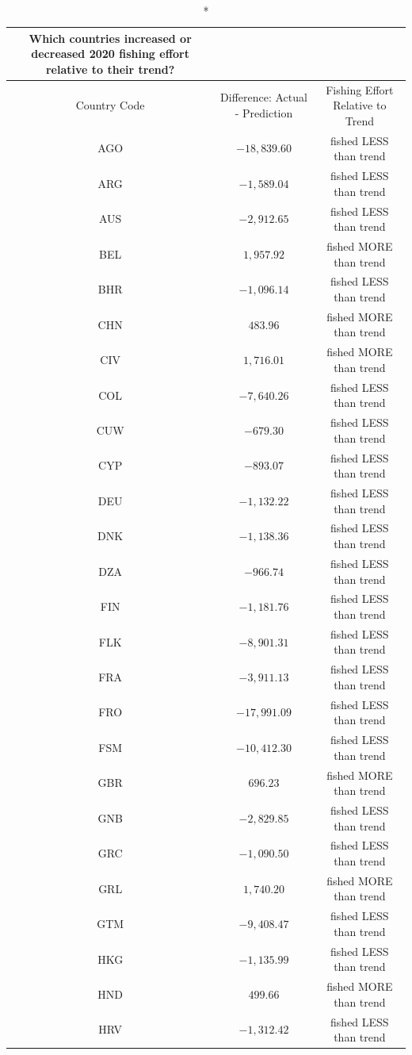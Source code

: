 \documentclass[
]{article}
\begin{document}
\captionsetup[table]{labelformat=empty,skip=1pt}
\begin{longtable}{ccc}
\caption*{
{\large \textbf{Which countries increased or decreased 2020 fishing effort relative to their trend?}}
} \\ 
\toprule
Country Code & Difference: Actual - Prediction & Fishing Effort Relative to Trend \\ 
\midrule
AGO & $-18,839.60$ & fished LESS than trend \\ 
ARG & $-1,589.04$ & fished LESS than trend \\ 
AUS & $-2,912.65$ & fished LESS than trend \\ 
BEL & $1,957.92$ & fished MORE than trend \\ 
BHR & $-1,096.14$ & fished LESS than trend \\ 
CHN & $483.96$ & fished MORE than trend \\ 
CIV & $1,716.01$ & fished MORE than trend \\ 
COL & $-7,640.26$ & fished LESS than trend \\ 
CUW & $-679.30$ & fished LESS than trend \\ 
CYP & $-893.07$ & fished LESS than trend \\ 
DEU & $-1,132.22$ & fished LESS than trend \\ 
DNK & $-1,138.36$ & fished LESS than trend \\ 
DZA & $-966.74$ & fished LESS than trend \\ 
FIN & $-1,181.76$ & fished LESS than trend \\ 
FLK & $-8,901.31$ & fished LESS than trend \\ 
FRA & $-3,911.13$ & fished LESS than trend \\ 
FRO & $-17,991.09$ & fished LESS than trend \\ 
FSM & $-10,412.30$ & fished LESS than trend \\ 
GBR & $696.23$ & fished MORE than trend \\ 
GNB & $-2,829.85$ & fished LESS than trend \\ 
GRC & $-1,090.50$ & fished LESS than trend \\ 
GRL & $1,740.20$ & fished MORE than trend \\ 
GTM & $-9,408.47$ & fished LESS than trend \\ 
HKG & $-1,135.99$ & fished LESS than trend \\ 
HND & $499.66$ & fished MORE than trend \\ 
HRV & $-1,312.42$ & fished LESS than trend \\ 

\end{longtable}
\end{document}
